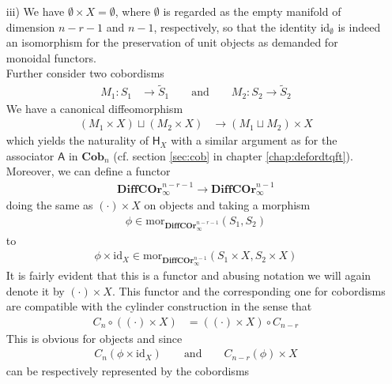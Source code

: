 \begin{prf}[Sketch]
\begin{enumerate}
\item[iii)]
We have $\emptyset \times X = \emptyset$, where $\emptyset$ is regarded as the empty manifold of dimension $n - r - 1$ and $n - 1$, respectively, so that the identity $\mathrm{id}_{\emptyset}$ is indeed an isomorphism for the preservation of unit objects as demanded for monoidal functors.
\\
Further consider two cobordisms
\begin{align*}
  M_{1}
  \colon
  S_{1}
  &\to
  \tilde{S}_{1}
  \qquad
  \text{and}
  \qquad
  M_{2}
  \colon
  S_{2}
  \to
  \tilde{S}_{2}
\end{align*}
We have a canonical diffeomorphism
\begin{align*}
  (M_{1} \times X)
  \sqcup
  (M_{2} \times X)
  &\to
  (M_{1} \sqcup M_{2})
  \times
  X
\end{align*}
which yields the naturality of $\mathsf{H}_{X}$ with a similar argument as for the associator $\mathsf{A}$ in $\mathbf{Cob}_{n}$ (cf. section \ref{sec:cob} in chapter \ref{chap:defordtqft}).
\\
Moreover, we can define a functor
\begin{align*}
  \mathbf{DiffCOr}_{\infty}^{n - r - 1}
  \to
  \mathbf{DiffCOr}_{\infty}^{n - 1}
\end{align*}
doing the same as $(\cdot) \times X$ on objects and taking a morphism
\begin{align*}
  \phi
  \in
  \mathrm{mor}_{\mathbf{DiffCOr}_{\infty}^{n - r - 1}}(S_{1},S_{2})
\end{align*}
to
\begin{align*}
  \phi
  \times
  \mathrm{id}_{X}
  \in
  \mathrm{mor}_{\mathbf{DiffCOr}_{\infty}^{n - 1}}
  \left(
    S_{1}
    \times
    X
    ,
    S_{2}
    \times
    X
  \right)
\end{align*}
It is fairly evident that this is a functor and abusing notation we will again denote it by $(\cdot) \times X$. This functor and the corresponding one for cobordisms are compatible with the cylinder construction in the sense that
\begin{align*}
  C_{n}
  \circ
  ((\cdot) \times X)
  &=
  ((\cdot) \times X)
  \circ
  C_{n - r}
\end{align*}
This is obvious for objects and since
\begin{align*}
  C_{n}(\phi \times \mathrm{id}_{X})
  \qquad
  \text{and}
  \qquad
  C_{n - r}(\phi)
  \times
  X
\end{align*}
can be respectively represented by the cobordisms
\begin{align*}

\end{align*}
\end{enumerate}
\end{prf}
